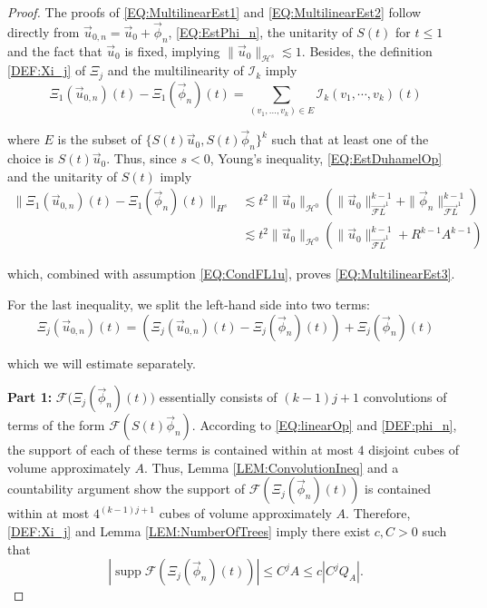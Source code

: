 \documentclass[letterpaper, 11pt,  reqno]{amsart}
\DeclareMathOperator*{\supp}{supp}
\newcommand{\1}{\hspace{0.5mm}\text{I}\hspace{0.5mm}}
\newcommand{\I}{\mathcal{I}}
\newcommand{\noi}{\noindent}
\newcommand{\FLv}{\overrightarrow{\mathcal{F}L}}
\renewcommand{\H}{\mathcal{H}}
\newcommand{\F}{\mathcal{F}}
\newcommand{\les}{\lesssim}
\numberwithin{equation}{section}
\numberwithin{theorem}{section}
\begin{document}
\begin{proof}
The proofs of \eqref{EQ:MultilinearEst1} and \eqref{EQ:MultilinearEst2} follow directly from $\vec{u}_{0,n} = \vec{u}_0 + \vec{\phi}_n$, \eqref{EQ:EstPhi_n}, the unitarity of $S(t)$ for $t \leq 1$ and the fact that $\vec{u}_0$ is fixed, implying $\|\vec{u}_0\|_{\H^s} \les 1$. Besides, the definition \eqref{DEF:Xi_j} of $\Xi_j$ and the multilinearity of $\I_k$ imply
$$
\Xi_1 (\vec{u}_{0,n})(t) - \Xi_1 (\vec{\phi}_n) (t) = \sum\limits_{(v_1, \dots, v_k) \in E} \mathcal{I}_k (v_1, \cdots, v_k)(t)
$$

\noi where $E$ is the subset of $\{ S(t)\vec{u}_0 , S(t)\vec{\phi}_n \}^k$ such that at least one of the choice is $S(t)\vec{u}_0$. Thus, since $s<0$, Young's inequality, \eqref{EQ:EstDuhamelOp} and the unitarity of $S(t)$ imply
\begin{align*}
\| \Xi_1 (\vec{u}_{0,n})(t) - \Xi_1 (\vec{\phi}_n) (t) \|_{H^s} & \les  t^2 \|\vec{u}_0 \|_{\H^0} \left(  \| \vec{u}_0 \|^{k-1}_{\FLv^1} + \| \vec{\phi}_n \|^{k-1}_{\FLv^1} \right) \\
	& \les t^2 \|\vec{u}_0 \|_{\H^0} \left(  \| \vec{u}_0 \|^{k-1}_{\FLv^1} + R^{k-1}A^{k-1} \right)
\end{align*}

\noi which, combined with assumption \eqref{EQ:CondFL1u}, proves \eqref{EQ:MultilinearEst3}.

For the last inequality, we split the left-hand side into two terms: 
\begin{equation}
\label{EQ:SplitXi_j}
\Xi_j (\vec{u}_{0,n})(t) = \left( \Xi_j (\vec{u}_{0,n})(t) - \Xi_j (\vec{\phi}_{n})(t) \right) + \Xi_j (\vec{\phi}_{n})(t)
\end{equation}

\noi which we will estimate separately.

{\bf Part 1:} $\F\big(\Xi_j (\vec{\phi}_{n})(t)\big)$ essentially consists of $(k-1)j + 1$ convolutions of terms of the form $\F(S(t) \vec{\phi}_n)$. According to \eqref{EQ:linearOp} and \eqref{DEF:phi_n}, the support of each of these terms is contained within at most $4$ disjoint cubes of volume approximately $A$. Thus, Lemma \ref{LEM:ConvolutionIneq} and a countability argument show the support of $ \F( \Xi_j (\vec{\phi}_{n})(t) )$ is contained within at most $4^{(k-1)j+1}$ cubes of volume approximately $A$. Therefore, \eqref{DEF:Xi_j} and Lemma \ref{LEM:NumberOfTrees} imply there exist $c,C > 0$ such that
$$
|\supp \F( \Xi_j (\vec{\phi}_{n})(t) ) | \leq C^j A \leq c |C^j Q_A |.
$$



\end{proof}
\end{document}
